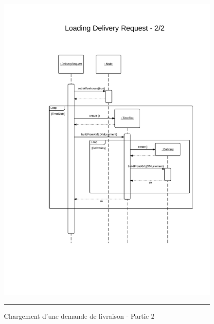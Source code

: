 \begin{figure}[H]
	\centering
		\includegraphics[width=\textwidth,height=\textheight,keepaspectratio]{Figures/chargement2}
		\rule{35em}{0.5pt}
	\caption[Chargement d'une demande de livraison - Partie 2]{Chargement d'une demande de livraison - Partie 2}
\end{figure}
\clearpage

